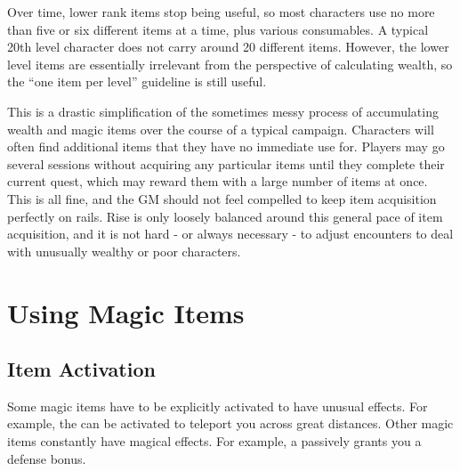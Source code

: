         Over time, lower rank items stop being useful, so most characters use no more than five or six different items at a time, plus various consumables.
        A typical 20th level character does not carry around 20 different items.
        However, the lower level items are essentially irrelevant from the perspective of calculating wealth, so the ``one item per level'' guideline is still useful.

        This is a drastic simplification of the sometimes messy process of accumulating wealth and magic items over the course of a typical campaign.
        Characters will often find additional items that they have no immediate use for.
        Players may go several sessions without acquiring any particular items until they complete their current quest, which may reward them with a large number of items at once.
        This is all fine, and the GM should not feel compelled to keep item acquisition perfectly on rails.
        Rise is only loosely balanced around this general pace of item acquisition, and it is not hard - or always necessary - to adjust encounters to deal with unusually wealthy or poor characters.

\section{Using Magic Items}

    \subsection{Item Activation}

        Some magic items have to be explicitly activated to have unusual effects.
        For example, the  can be activated to teleport you across great distances.
        Other magic items constantly have magical effects.
        For example, a  passively grants you a defense bonus.

